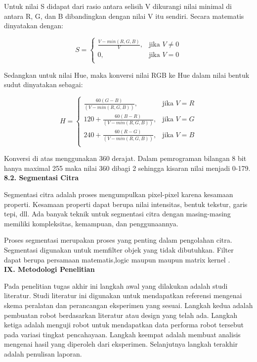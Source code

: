 \documentclass[a4paper,12pt]{article}
\begin{document}
Untuk nilai S didapat dari rasio antara selisih V dikurangi nilai minimal di antara R, G, dan B dibandingkan dengan nilai V itu sendiri.
Secara matematis dinyatakan dengan:

\begin{equation}
  S =  
  \begin{cases}
      \frac{V-min(R,G,B)}{V},& \text{jika } V\neq 0\\
      0,              & \text{jika } V = 0\\
  \end{cases}
\end{equation}


Sedangkan untuk nilai Hue, maka konversi nilai RGB ke Hue dalam nilai bentuk sudut dinyatakan sebagai:

\begin{equation}
  H =  
  \begin{cases}
      \frac{60(G-B)}{(V-min(R,G,B))},& \text{jika } V = R\\
      120 + \frac{60(B-R)}{(V-min(R,G,B))},& \text{jika } V = G\\
      240 + \frac{60(R-G)}{(V-min(R,G,B))},& \text{jika } V = B\\
  \end{cases}
\end{equation}

Konversi di atas menggunakan 360 derajat.
Dalam pemrograman bilangan 8 bit hanya maximal 255 maka nilai 360 dibagi 2 sehingga kisaran nilai menjadi 0-179.
\\[10pt]
\indent \textbf{8.2. \hspace{8pt} Segmentasi Citra}

Segmentasi citra adalah proses mengumpulkan pixel-pixel karena kesamaan properti.
Kesamaan properti dapat berupa nilai intensitas, bentuk tekstur, garis tepi, dll.
Ada banyak teknik untuk segmentasi citra dengan masing-masing memiliki kompleksitas, kemampuan, dan penggunaannya.

Proses segmentasi merupakan proses yang penting dalam pengolahan citra.
Segmentasi digunakan untuk memfilter objek yang tidak dibutuhkan.
Filter dapat berupa persamaan matematis,logic maupun maupun matrix kernel \cite{improc1} .
\\[10pt]
\noindent \textbf{IX. \hspace{9pt} Metodologi Penelitian}

Pada penelitian tugas akhir ini langkah awal yang dilakukan adalah studi literatur.
Studi literatur ini digunakan untuk mendapatkan referensi mengenai skema peralatan dan perancangan eksperimen yang sesuai.
Langkah kedua adalah pembuatan robot berdasarkan literatur atau design yang telah ada.
Langkah ketiga adalah menguji robot untuk mendapatkan data performa robot tersebut pada variasi tingkat pencahayaan.
Langkah keempat adalah membuat analisis mengenai hasil yang diperoleh dari eksperimen. 
Selanjutnya langkah terakhir adalah penulisan laporan.
\end{document}
